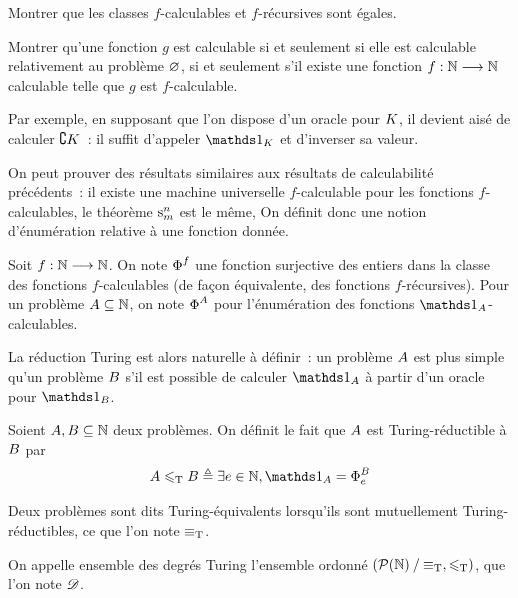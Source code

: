 \begin{exercise}
  Montrer que les classes $f$-calculables et $f$-récursives sont égales.
\end{exercise}

\begin{exercise}
  Montrer qu'une fonction $g$ est calculable si et seulement si elle est
  calculable relativement au problème $\varnothing$, si et seulement s'il existe
  une fonction $f : \displaystyle \mathbb N \longrightarrow \mathbb N$ calculable telle que $g$ est
  $f$-calculable.
\end{exercise}

Par exemple, en supposant que l'on dispose d'un oracle pour $K$, il devient
aisé de calculer $\complement K$~: il suffit d'appeler $\indicP{\KH}$ et
d'inverser sa valeur.

On peut prouver des résultats similaires aux résultats de calculabilité
précédents~: il existe une machine universelle $f$-calculable pour les fonctions
$f$-calculables, le théorème $\mathrm{s}_{m}^{n}$ est le même,  On
définit donc une notion d'énumération relative à une fonction donnée.

\begin{definition}
  Soit $f : \displaystyle \mathbb N \longrightarrow \mathbb N$. On note $\operatorname{\Phi}_{}^{f}$ une fonction
  surjective des entiers dans la classe des fonctions $f$-calculables (de façon
  équivalente, des fonctions $f$-récursives). Pour un problème
  $A\subseteq \mathbb N$, on note $\operatorname{\Phi}_{}^{A}$ pour l'énumération des
  fonctions $\indicP{\varPt}$-calculables.
\end{definition}

La réduction Turing est alors naturelle à définir~: un problème $A$ est
plus simple qu'un problème $B$ s'il est possible de calculer
$\indicP{\varPt}$ à partir d'un oracle pour $\indicP{\varPtB}$.

\begin{definition}
  Soient $A,B\subseteq \mathbb N$ deux problèmes. On définit le fait que
  $A$ est Turing-réductible à $B$ par
  \[\varPt \TuringRed \varPtB \defeq \exists e \in \bN,
  \indicP{\varPt} = \EnumP{e}{\varPtB}\]

  Deux problèmes sont dits Turing-équivalents lorsqu'ils sont mutuellement
  Turing-réductibles, ce que l'on note $\equiv_{\mathrm{T}}$.

  On appelle ensemble des degrés Turing l'ensemble ordonné
  $(\mathord{\mathcal{P}(\mathbb N)}\mathbin{/}\mathord{\equiv_{\mathrm{T}}}, \leqslant_{\mathrm{T}})$, que l'on note $\TuringDeg$.
  \index[notation]{$\TuringRed$}
  \index[notation]{$\TuringDeg$}
\end{definition}

